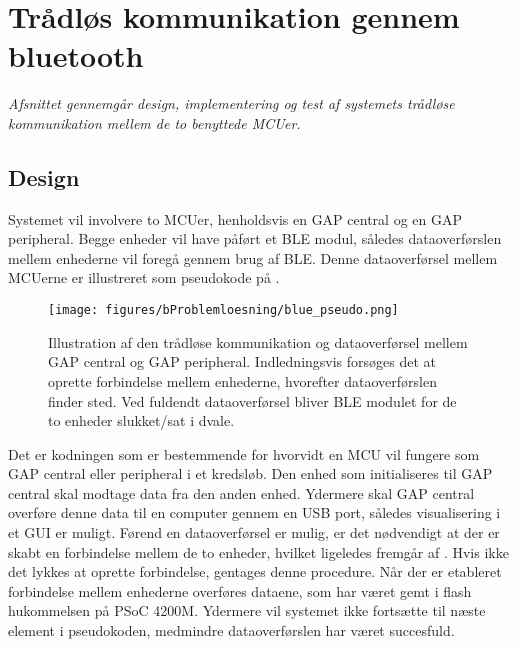 \section{Trådløs kommunikation gennem bluetooth}
\textit{Afsnittet gennemgår design, implementering og test af systemets trådløse kommunikation mellem de to benyttede MCUer.}

\subsection{Design}
Systemet vil involvere to MCUer, henholdsvis en GAP central og en GAP peripheral. Begge enheder vil have påført et BLE modul, således dataoverførslen mellem enhederne vil foregå gennem brug af BLE. Denne dataoverførsel mellem MCUerne er illustreret som pseudokode på . 

\begin{figure}[H]
	\centering
	\texttt{[image: figures/bProblemloesning/blue\_pseudo.png]}
	\caption{Illustration af den trådløse kommunikation og dataoverførsel mellem GAP central og GAP peripheral. Indledningsvis forsøges det at oprette forbindelse mellem enhederne, hvorefter dataoverførslen finder sted. Ved fuldendt dataoverførsel bliver BLE modulet for de to enheder slukket/sat i dvale.}
	\label{fig:blue_pseudo}
\end{figure}

Det er kodningen som er bestemmende for hvorvidt en MCU vil fungere som GAP central eller peripheral i et kredsløb. Den enhed som initialiseres til GAP central skal modtage data fra den anden enhed. Ydermere skal GAP central overføre denne data til en computer gennem en USB port, således visualisering i et GUI er muligt. \newline
Førend en dataoverførsel er mulig, er det nødvendigt at der er skabt en forbindelse mellem de to enheder, hvilket ligeledes fremgår af . Hvis ikke det lykkes at oprette forbindelse, gentages denne procedure. Når der er etableret forbindelse mellem enhederne overføres dataene, som har været gemt i flash hukommelsen på PSoC 4200M. Ydermere vil systemet ikke fortsætte til næste element i pseudokoden, medmindre dataoverførslen har været succesfuld.  

